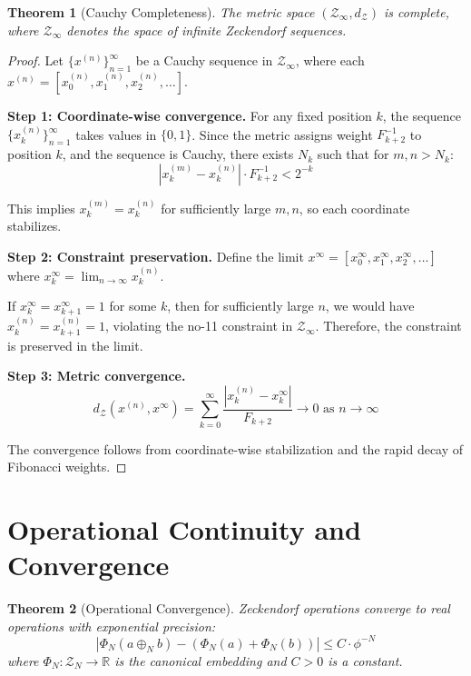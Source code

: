 \documentclass[12pt]{article}
\theoremstyle{plain}
\newtheorem{theorem}{Theorem}[section]
\theoremstyle{definition}
\begin{document}
\begin{theorem}[Cauchy Completeness]
\label{thm:completeness}
The metric space $(\mathcal{Z}_\infty, d_{\mathcal{Z}})$ is complete, where $\mathcal{Z}_\infty$ denotes the space of infinite Zeckendorf sequences.
\end{theorem}

\begin{proof}
Let $\{x^{(n)}\}_{n=1}^\infty$ be a Cauchy sequence in $\mathcal{Z}_\infty$, where each $x^{(n)} = [x_0^{(n)}, x_1^{(n)}, x_2^{(n)}, \ldots]$.

\textbf{Step 1: Coordinate-wise convergence.}
For any fixed position $k$, the sequence $\{x_k^{(n)}\}_{n=1}^\infty$ takes values in $\{0,1\}$. Since the metric assigns weight $F_{k+2}^{-1}$ to position $k$, and the sequence is Cauchy, there exists $N_k$ such that for $m,n > N_k$:
$$|x_k^{(m)} - x_k^{(n)}| \cdot F_{k+2}^{-1} < 2^{-k}$$

This implies $x_k^{(m)} = x_k^{(n)}$ for sufficiently large $m,n$, so each coordinate stabilizes.

\textbf{Step 2: Constraint preservation.}
Define the limit $x^\infty = [x_0^\infty, x_1^\infty, x_2^\infty, \ldots]$ where $x_k^\infty = \lim_{n \to \infty} x_k^{(n)}$.

If $x_k^\infty = x_{k+1}^\infty = 1$ for some $k$, then for sufficiently large $n$, we would have $x_k^{(n)} = x_{k+1}^{(n)} = 1$, violating the no-11 constraint in $\mathcal{Z}_\infty$. Therefore, the constraint is preserved in the limit.

\textbf{Step 3: Metric convergence.}
$$d_{\mathcal{Z}}(x^{(n)}, x^\infty) = \sum_{k=0}^{\infty} \frac{|x_k^{(n)} - x_k^\infty|}{F_{k+2}} \to 0 \text{ as } n \to \infty$$

The convergence follows from coordinate-wise stabilization and the rapid decay of Fibonacci weights.
\end{proof}

\section{Operational Continuity and Convergence}

\begin{theorem}[Operational Convergence]
\label{thm:operational-convergence}
Zeckendorf operations converge to real operations with exponential precision:
$$\left|\Phi_N(a \oplus_N b) - (\Phi_N(a) + \Phi_N(b))\right| \leq C \cdot \phi^{-N}$$
where $\Phi_N: \mathcal{Z}_N \to \mathbb{R}$ is the canonical embedding and $C > 0$ is a constant.
\end{theorem}
\end{document}
